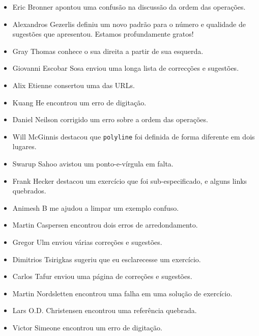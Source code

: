 \documentclass[10pt]{book}
\begin{document}
\begin {itemize}
\item Eric Bronner apontou uma confusão na discussão da
ordem das operações.

\item Alexandros Gezerlis definiu um novo padrão para o número e
qualidade de sugestões que apresentou. Estamos profundamente gratos!

\item Gray Thomas conhece o sua direita a partir de sua esquerda.

\item Giovanni Escobar Sosa enviou uma longa lista de correcções e
sugestões.

\item Alix Etienne consertou uma das URLs.

\item Kuang He encontrou um erro de digitação.

\item Daniel Neilson corrigido um erro sobre a ordem das operações.

\item Will McGinnis destacou que {\tt polyline} foi definida
de forma diferente em dois lugares.

\item Swarup Sahoo avistou um ponto-e-vírgula em falta.

\item Frank Hecker destacou um exercício que foi sub-especificado, e
alguns links quebrados.

\item Animesh B me ajudou a limpar um exemplo confuso. %

\item Martin Caspersen encontrou dois erros de arredondamento. %

\item Gregor Ulm enviou várias correções e sugestões.

\item Dimitrios Tsirigkas sugeriu que eu esclarecesse um exercício.

\item Carlos Tafur enviou uma página de correções e sugestões.

\item Martin Nordsletten encontrou uma falha em uma solução de exercício.

\item Lars O.D. Christensen encontrou uma referência quebrada.

\item Victor Simeone encontrou um erro de digitação.


\end{itemize}
\end{document}
